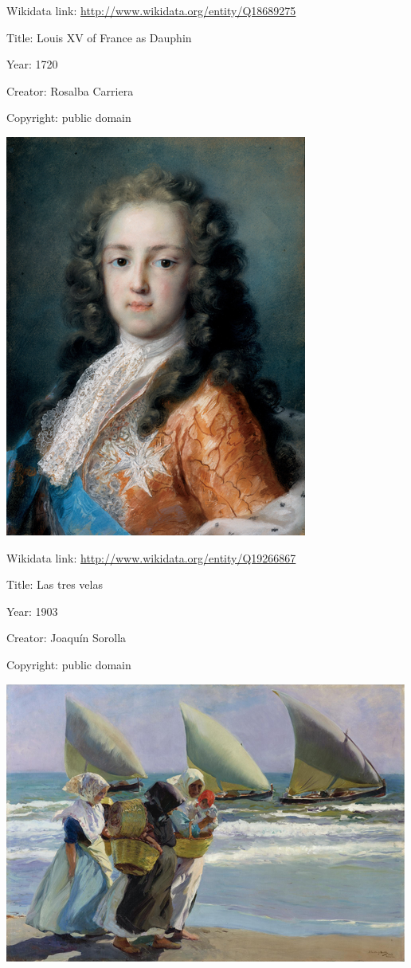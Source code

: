 \documentclass[
  letterpaper,
]{book}
\begin{document}
Wikidata link: \url{http://www.wikidata.org/entity/Q18689275}

Title: Louis XV of France as Dauphin

Year: 1720

Creator: Rosalba Carriera

Copyright: public domain

\includegraphics{paintings_files/figure-pdf/cell-2-output-6.png}

Wikidata link: \url{http://www.wikidata.org/entity/Q19266867}

Title: Las tres velas

Year: 1903

Creator: Joaquín Sorolla

Copyright: public domain

\includegraphics{paintings_files/figure-pdf/cell-2-output-8.png}
\end{document}
